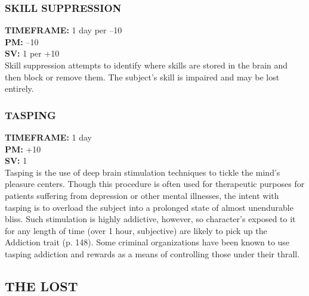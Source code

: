 \subsubsection{SKILL SUPPRESSION}
\textbf{TIMEFRAME:} 1 day per –10 \\
\textbf{PM:} –10 \\
\textbf{SV:} 1 per +10 \\
Skill suppression attempts to identify where skills are
stored in the brain and then block or remove them.
The subject’s skill is impaired and may be lost entirely.

\subsubsection{TASPING}
\textbf{TIMEFRAME:} 1 day \\
\textbf{PM:} +10 \\
\textbf{SV:} 1 \\
Tasping is the use of deep brain stimulation techniques
to tickle the mind’s pleasure centers. Though this
procedure is often used for therapeutic purposes for
patients suffering from depression or other mental
illnesses, the intent with tasping is to overload the
subject into a prolonged state of almost unendurable
bliss. Such stimulation is highly addictive, however, so
character’s exposed to it for any length of time (over
1 hour, subjective) are likely to pick up the Addiction
trait (p. 148). Some criminal organizations have been
known to use tasping addiction and rewards as a
means of controlling those under their thrall.


\subsection{THE LOST}

